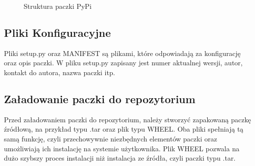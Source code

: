 \begin{figure}
\centering
    \begin{minipage}{7cm}
    \end{minipage}
    \caption{Struktura paczki PyPi}
\end{figure}

\subsection{Pliki Konfiguracyjne}
\quad Pliki setup.py oraz MANIFEST są plikami, które odpowiadają za konfigurację oraz opis paczki. W pliku setup.py zapisany jest numer aktualnej wersji, autor, kontakt do autora, nazwa paczki itp. 

\quad 


\subsection{Załadowanie paczki do repozytorium}

\quad Przed załadowaniem paczki do repozytorium, należy stworzyć zapakowaną paczkę źródłową, na przykład typu .tar oraz plik typu WHEEL. Oba pliki spełniają tą samą funkcję, czyli przechowywnie niezbędnych elementów paczki oraz umożliwiają ich instalację na systemie użytkownika. Plik WHEEL pozwala na dużo szybszy proces instalacji niż instalacja ze źródła, czyli paczki typu .tar. 
